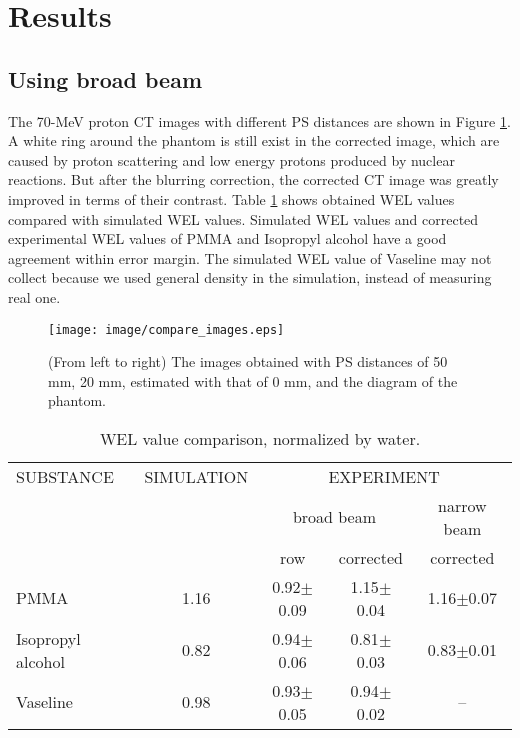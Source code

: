 \documentclass[preprint,3pt]{elsarticle} %
\begin{document}
{\section{Results}
\subsection{Using broad beam}
	The 70-MeV proton CT images with different PS distances are shown in Figure \ref{comparePSdis}. A white ring around the phantom is still exist in the corrected image, which are caused by proton scattering and low energy protons produced by nuclear reactions. But after the blurring correction, the corrected CT image was greatly improved in terms of their contrast. Table \ref{WELtable} shows obtained WEL values compared with simulated WEL values. Simulated WEL values and corrected experimental WEL values of PMMA and Isopropyl alcohol have a good agreement within error margin. The simulated WEL value of Vaseline may not collect because we used general density in the simulation, instead of measuring real one. \\
\begin{figure}[H]
\centering
\texttt{[image: image/compare\_images.eps]}
\caption{(From left to right) The images obtained with PS distances of 50 mm, 20 mm, estimated with that of 0 mm, and the diagram of the phantom.  
\label{comparePSdis}}
\end{figure}

\begin{table}[h]
\centering
\begin{tabular}{p{3cm}cccc} 
\hline
SUBSTANCE & SIMULATION & \multicolumn{3}{c}{EXPERIMENT} \\ 
 & & \multicolumn{2}{c}{broad beam} & narrow beam\\ 
 & & row & corrected & corrected\\
\hline
PMMA & 1.16 & 0.92$\pm$0.09 &   1.15$\pm$0.04 & 1.16$\pm$0.07 \\%
Isopropyl alcohol & 0.82 & 0.94$\pm$0.06 &  0.81$\pm$0.03 & 0.83$\pm$0.01 \\%
Vaseline & 0.98 & 0.93$\pm$0.05  &  0.94$\pm$0.02 & -- \\%
\hline
\end{tabular}
\caption{WEL value comparison, normalized by water.}
\label{WELtable}
\end{table}

}
\end{document}
